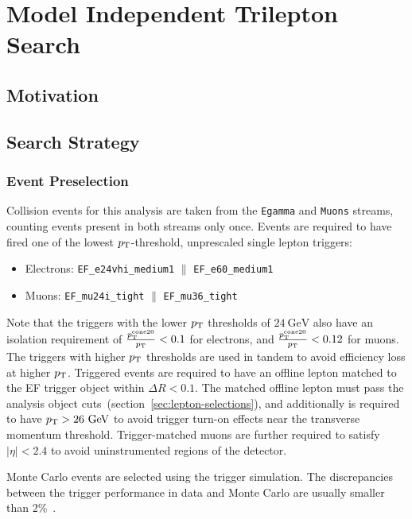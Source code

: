 \chapter{Model Independent Trilepton Search}
\section{Motivation}

\section{Search Strategy}
\subsection{Event Preselection}\label{sec:event-preselection}
Collision events for this analysis are taken from the \verb.Egamma. and \verb.Muons. streams, counting events present in both streams only once. Events are required to have fired one of the lowest $p_{\text{T}}$-threshold, unprescaled single lepton triggers:

\begin{itemize}
	\item Electrons: \verb.EF_e24vhi_medium1. $\parallel$ \verb.EF_e60_medium1.
	\item Muons: \verb.EF_mu24i_tight. $\parallel$ \verb.EF_mu36_tight.
\end{itemize}

Note that the triggers with the lower $p_{\text{T}}$ thresholds of $24~\mbox{GeV}$ also have an isolation requirement of $\frac{p_{\text{T}}^{\mathrm{cone}20}}{p_{\text{T}}}<0.1$ for electrons, and $\frac{p_{\text{T}}^{\mathrm{cone}20}}{p_{\text{T}}}<0.12$ for muons. The triggers with higher $p_{\text{T}}$ thresholds are used in tandem to avoid efficiency loss at higher $p_{\text{T}}$. 
Triggered events are required to have an offline lepton matched to the EF trigger object within $\Delta R<0.1$. The matched offline lepton must pass the analysis object cuts~(section~\ref{sec:lepton-selections}), and additionally is required to have $p_{\text{T}}>26~\mbox{GeV}$ to avoid trigger turn-on effects near the transverse momentum threshold. Trigger-matched muons are further required to satisfy $|\eta|<2.4$ to avoid uninstrumented regions of the detector.

Monte Carlo events are selected using the trigger simulation. The discrepancies between the trigger performance in data and Monte Carlo are usually smaller than 2\%~\cite{Ancu:1501709}. 

